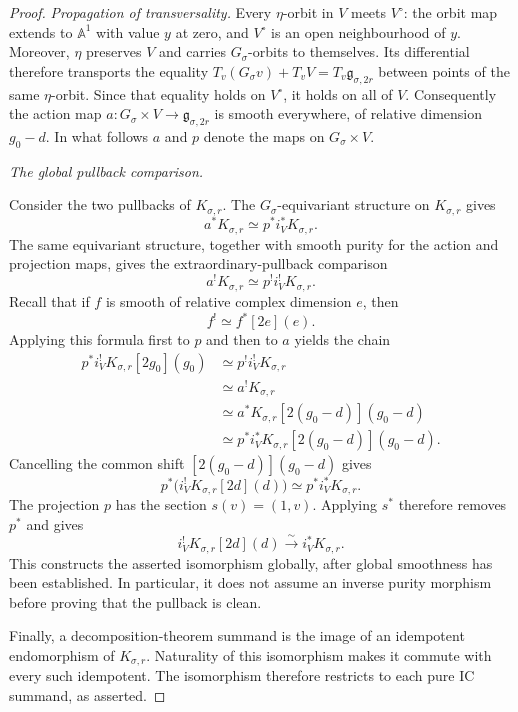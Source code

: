 \documentclass[11pt]{amsart}
\theoremstyle{definition}
\theoremstyle{remark}
\begin{document}
\begin{proof}
\smallskip
\noindent\emph{Propagation of transversality.}
Every $\eta$-orbit in $V$ meets $V^\circ$: the orbit map extends to
$\mathbb A^1$ with value $y$ at zero, and $V^\circ$ is an open
neighbourhood of $y$.  Moreover, $\eta$ preserves $V$ and carries
$G_\sigma$-orbits to themselves.  Its differential therefore transports
the equality
$T_v(G_\sigma v)+T_vV=T_v\mathfrak g_{\sigma,2r}$
between points of the same $\eta$-orbit.  Since that equality holds on
$V^\circ$, it holds on all of $V$.
Consequently the action map
$a:G_\sigma\times V\to\mathfrak g_{\sigma,2r}$ is smooth everywhere,
of relative dimension $g_0-d$.  In what follows $a$ and $p$ denote
the maps on $G_\sigma\times V$.

\smallskip
\noindent\emph{The global pullback comparison.}

Consider the two pullbacks of $K_{\sigma,r}$.  The
$G_\sigma$-equivariant structure on $K_{\sigma,r}$ gives
\[
 a^*K_{\sigma,r}\simeq p^*i_V^*K_{\sigma,r}.
\]
The same equivariant structure, together with smooth purity for the action
and projection maps, gives the extraordinary-pullback comparison
\[
 a^!K_{\sigma,r}\simeq p^!i_V^!K_{\sigma,r}.
\]
Recall that if $f$ is smooth of relative complex dimension $e$, then
\[
 f^!\simeq f^*[2e](e).
\]
Applying this formula first to $p$ and then to $a$ yields the chain
\[
\begin{aligned}
 p^*i_V^!K_{\sigma,r}[2g_0](g_0)
 &\simeq p^!i_V^!K_{\sigma,r}\\
 &\simeq a^!K_{\sigma,r}\\
 &\simeq a^*K_{\sigma,r}[2(g_0-d)](g_0-d)\\
 &\simeq p^*i_V^*K_{\sigma,r}
       [2(g_0-d)](g_0-d).
\end{aligned}
\]
Cancelling the common shift $[2(g_0-d)](g_0-d)$ gives
\[
 p^*\bigl(i_V^!K_{\sigma,r}[2d](d)\bigr)
 \simeq p^*i_V^*K_{\sigma,r}.
\]
The projection $p$ has the section $s(v)=(1,v)$.  Applying $s^*$ therefore
removes $p^*$ and gives
\[
 i_V^!K_{\sigma,r}[2d](d)
 \xrightarrow{\sim}i_V^*K_{\sigma,r}.
\]
This constructs the asserted isomorphism globally, after global
smoothness has been established.  In particular, it does not assume
an inverse purity morphism before proving that the pullback is clean.

Finally, a decomposition-theorem summand is the image of an idempotent
endomorphism of $K_{\sigma,r}$.  Naturality of this isomorphism makes it commute with
every such idempotent.  The isomorphism therefore restricts to each pure IC
summand, as asserted.
\end{proof}
\end{document}
